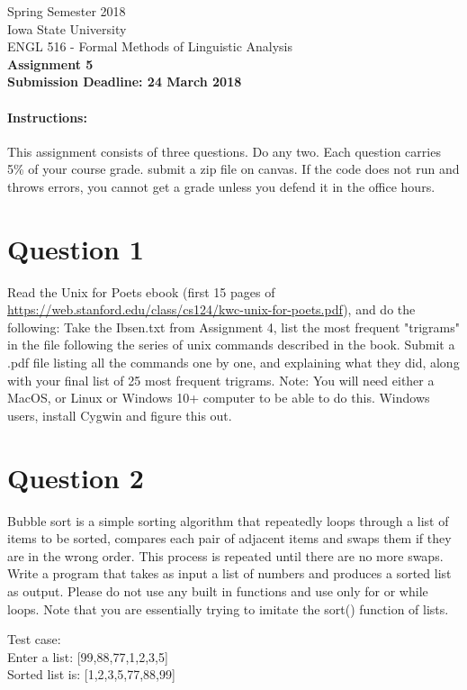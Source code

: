 \documentclass[11pt,a4paper]{article}
\begin{document}
\begin{center}
  Spring Semester 2018 \\ Iowa State University\\[3ex]
  {\large ENGL 516 - Formal Methods of Linguistic Analysis}\\[3ex]
  \textbf{Assignment 5} \\ \textbf{Submission Deadline: 24 March 2018}
\end{center}


\paragraph{Instructions:} This assignment consists of three questions. Do any two. Each question carries 5\% of your course grade. submit a zip file on canvas. If the code does not run and throws errors, you cannot get a grade unless you defend it in the office hours.

\section*{Question 1}
Read the Unix for Poets ebook (first 15 pages of \url{https://web.stanford.edu/class/cs124/kwc-unix-for-poets.pdf}), and do the following: Take the Ibsen.txt from Assignment 4, list the most frequent "trigrams" in the file following the series of unix commands described in the book. Submit a .pdf file listing all the commands one by one, and explaining what they did, along with your final list of 25 most frequent trigrams. Note: You will need either a MacOS, or Linux or Windows 10+ computer to be able to do this. Windows users, install Cygwin and figure this out. 

\section*{Question 2}
Bubble sort is a simple sorting algorithm that repeatedly loops through a list of items to be sorted, compares each pair of adjacent items and swaps them if they are in the wrong order. This process is repeated until there are no more swaps. Write a program that takes as input a list of numbers and produces a sorted list as output. Please do not use any built in functions and use only for or while loops. Note that you are essentially trying to imitate the sort() function of lists.

\medskip
Test case: 
\\ Enter a list: [99,88,77,1,2,3,5]
\\ Sorted list is: [1,2,3,5,77,88,99]
\end{document}
